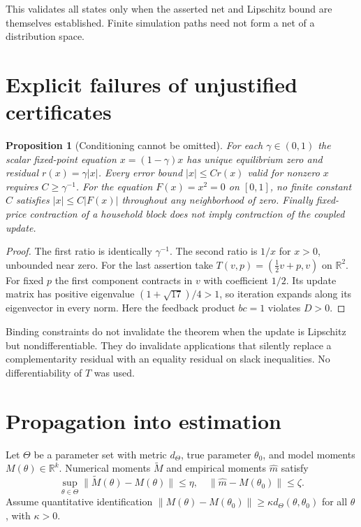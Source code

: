 \documentclass[11pt]{article}
\newtheorem{proposition}[theorem]{Proposition}
\theoremstyle{remark}
\newcommand{\R}{\mathbb R}
\begin{document}
This validates all states only when the asserted net and Lipschitz bound
are themselves established. Finite simulation paths need not form a net
of a distribution space.

\section{Explicit failures of unjustified certificates}
\begin{proposition}[Conditioning cannot be omitted]
For each $\gamma\in(0,1)$ the scalar fixed-point equation
$x=(1-\gamma)x$ has unique equilibrium zero and residual
$r(x)=\gamma|x|$. Every error bound $|x|\leq C r(x)$ valid for nonzero
$x$ requires $C\geq\gamma^{-1}$. For the equation $F(x)=x^2=0$ on
$[0,1]$, no finite constant $C$ satisfies $|x|\leq C|F(x)|$ throughout
any neighborhood of zero. Finally fixed-price contraction of a household
block does not imply contraction of the coupled update.
\end{proposition}
\begin{proof}
The first ratio is identically $\gamma^{-1}$. The second ratio is $1/x$
for $x>0$, unbounded near zero. For the last assertion take
$T(v,p)=(\tfrac12v+p,v)$ on $\R^2$. For fixed $p$ the first component
contracts in $v$ with coefficient $1/2$. Its update matrix has positive
eigenvalue $(1+\sqrt{17})/4>1$, so iteration expands along its eigenvector
in every norm. Here the feedback product $bc=1$ violates $D>0$.
\end{proof}

Binding constraints do not invalidate the theorem when the update is
Lipschitz but nondifferentiable. They do invalidate applications that
silently replace a complementarity residual with an equality residual
on slack inequalities. No differentiability of $T$ was used.

\section{Propagation into estimation}
Let $\Theta$ be a parameter set with metric $d_\Theta$, true parameter
$\theta_0$, and model moments $M(\theta)\in\R^k$. Numerical moments
$\widetilde M$ and empirical moments $\widehat m$ satisfy
\[
 \sup_{\theta\in\Theta}\|\widetilde M(\theta)-M(\theta)\|\leq\eta,
 \quad \|\widehat m-M(\theta_0)\|\leq\zeta.
\]
Assume quantitative identification
$\|M(\theta)-M(\theta_0)\|\geq\kappa d_\Theta(\theta,\theta_0)$
for all $\theta$, with $\kappa>0$.
\end{document}
